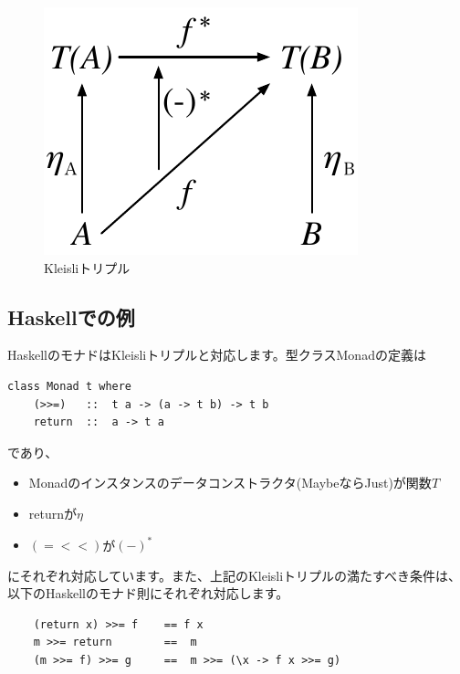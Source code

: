 \documentclass{jsarticle}
\begin{document}
\begin{figure}[htbp]
    \centering
    \includegraphics{diag_kleisli.pdf}
    \caption{Kleisliトリプル}
\end{figure}

\subsection{Haskellでの例}
HaskellのモナドはKleisliトリプルと対応します。型クラスMonadの定義は
\begin{lstlisting}
class Monad t where
    (>>=)   ::  t a -> (a -> t b) -> t b
    return  ::  a -> t a
\end{lstlisting}
であり、
\begin{itemize}
    \item Monadのインスタンスのデータコンストラクタ(MaybeならJust)が関数$T$
    \item returnが$\eta$
    \item $(=<<)$が$(-)^*$
\end{itemize}
にそれぞれ対応しています。また、上記のKleisliトリプルの満たすべき条件は、
以下のHaskellのモナド則にそれぞれ対応します。
\begin{lstlisting}
    (return x) >>= f    == f x
    m >>= return        ==  m
    (m >>= f) >>= g     ==  m >>= (\x -> f x >>= g)
\end{lstlisting}
\end{document}
